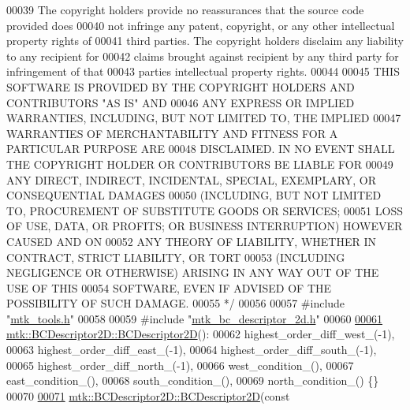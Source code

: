 \begin{DoxyCode}
00039 \textcolor{comment}{The copyright holders provide no reassurances that the source code provided does}
00040 \textcolor{comment}{not infringe any patent, copyright, or any other intellectual property rights of}
00041 \textcolor{comment}{third parties. The copyright holders disclaim any liability to any recipient for}
00042 \textcolor{comment}{claims brought against recipient by any third party for infringement of that}
00043 \textcolor{comment}{parties intellectual property rights.}
00044 \textcolor{comment}{}
00045 \textcolor{comment}{THIS SOFTWARE IS PROVIDED BY THE COPYRIGHT HOLDERS AND CONTRIBUTORS "AS IS" AND}
00046 \textcolor{comment}{ANY EXPRESS OR IMPLIED WARRANTIES, INCLUDING, BUT NOT LIMITED TO, THE IMPLIED}
00047 \textcolor{comment}{WARRANTIES OF MERCHANTABILITY AND FITNESS FOR A PARTICULAR PURPOSE ARE}
00048 \textcolor{comment}{DISCLAIMED. IN NO EVENT SHALL THE COPYRIGHT HOLDER OR CONTRIBUTORS BE LIABLE FOR}
00049 \textcolor{comment}{ANY DIRECT, INDIRECT, INCIDENTAL, SPECIAL, EXEMPLARY, OR CONSEQUENTIAL DAMAGES}
00050 \textcolor{comment}{(INCLUDING, BUT NOT LIMITED TO, PROCUREMENT OF SUBSTITUTE GOODS OR SERVICES;}
00051 \textcolor{comment}{LOSS OF USE, DATA, OR PROFITS; OR BUSINESS INTERRUPTION) HOWEVER CAUSED AND ON}
00052 \textcolor{comment}{ANY THEORY OF LIABILITY, WHETHER IN CONTRACT, STRICT LIABILITY, OR TORT}
00053 \textcolor{comment}{(INCLUDING NEGLIGENCE OR OTHERWISE) ARISING IN ANY WAY OUT OF THE USE OF THIS}
00054 \textcolor{comment}{SOFTWARE, EVEN IF ADVISED OF THE POSSIBILITY OF SUCH DAMAGE.}
00055 \textcolor{comment}{*/}
00056 
00057 \textcolor{preprocessor}{#include "\hyperlink{mtk__tools_8h}{mtk\_tools.h}"}
00058 
00059 \textcolor{preprocessor}{#include "\hyperlink{mtk__bc__descriptor__2d_8h}{mtk\_bc\_descriptor\_2d.h}"}
00060 
\hypertarget{mtk__bc__descriptor__2d_8cc_source_l00061}{}\hyperlink{classmtk_1_1BCDescriptor2D_abbc3af29202dbfef203f4cafd9566fd0}{00061} \hyperlink{classmtk_1_1BCDescriptor2D_abbc3af29202dbfef203f4cafd9566fd0}{mtk::BCDescriptor2D::BCDescriptor2D}():
00062   highest\_order\_diff\_west\_(-1),
00063   highest\_order\_diff\_east\_(-1),
00064   highest\_order\_diff\_south\_(-1),
00065   highest\_order\_diff\_north\_(-1),
00066   west\_condition\_(),
00067   east\_condition\_(),
00068   south\_condition\_(),
00069   north\_condition\_() \{\}
00070 
\hypertarget{mtk__bc__descriptor__2d_8cc_source_l00071}{}\hyperlink{classmtk_1_1BCDescriptor2D_ae8a93352a94efed52747b710e6ff7893}{00071} \hyperlink{classmtk_1_1BCDescriptor2D_abbc3af29202dbfef203f4cafd9566fd0}{mtk::BCDescriptor2D::BCDescriptor2D}(\textcolor{keyword}{const} 

\end{DoxyCode}
